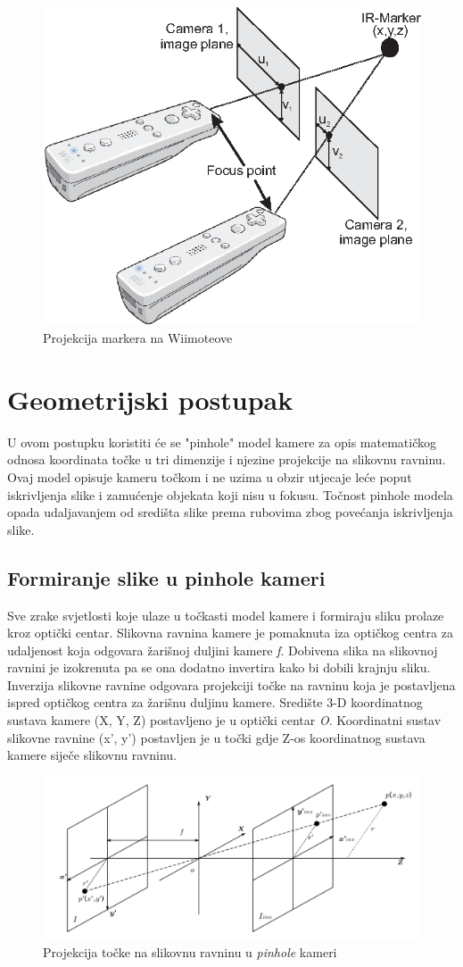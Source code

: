 \documentclass[times, utf8, diplomski]{fer}
\begin{document}
\begin{figure}[h]
\centering
\includegraphics[width=.6\textwidth]{wiimote2_rays}
\caption{Projekcija markera na Wiimoteove}
\label{fig:zrake}
\end{figure}

\section{Geometrijski postupak}
U ovom postupku koristiti će se "pinhole" model kamere za opis matematičkog odnosa koordinata točke u tri dimenzije i njezine projekcije na slikovnu ravninu. Ovaj model opisuje kameru točkom i ne uzima u obzir utjecaje leće poput iskrivljenja slike i zamućenje objekata koji nisu u fokusu. Točnost pinhole modela opada udaljavanjem od središta slike prema rubovima zbog povećanja iskrivljenja slike.

\subsection{Formiranje slike u pinhole kameri}
Sve zrake svjetlosti koje ulaze u točkasti model kamere i formiraju sliku prolaze kroz optički centar. Slikovna ravnina kamere je pomaknuta iza optičkog centra za udaljenost koja odgovara žarišnoj duljini kamere \textit{f}. Dobivena slika na slikovnoj ravnini je izokrenuta pa se ona dodatno invertira kako bi dobili krajnju sliku. Inverzija slikovne ravnine odgovara projekciji točke na ravninu koja je postavljena ispred optičkog centra za žarišnu duljinu kamere. Središte 3-D koordinatnog sustava kamere (X, Y, Z) postavljeno je u optički centar \textit{O}. Koordinatni sustav slikovne ravnine (x', y') postavljen je u točki gdje Z-os koordinatnog sustava kamere siječe slikovnu ravninu.

\begin{figure}[h]
\centering
\includegraphics[width=.9\textwidth]{projekcija}
\caption{Projekcija točke na slikovnu ravninu u \textit{pinhole} kameri}
\label{fig:projekcija}
\end{figure}
\end{document}
